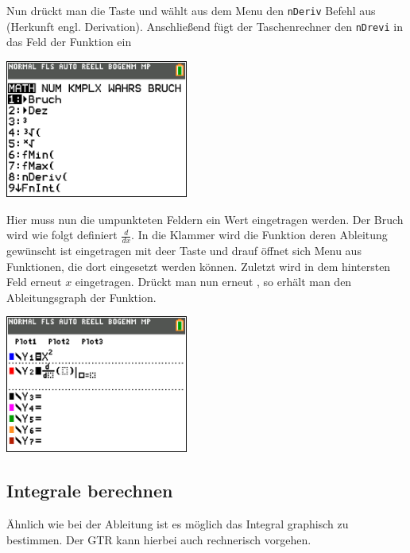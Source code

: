 \begin{paracol}{2}
\begin{flushleft}
	Nun drückt man die Taste  und wählt aus dem Menu den \texttt{nDeriv} Befehl aus (Herkunft engl. Derivation). Anschließend fügt der Taschenrechner den \texttt{nDrevi} in das Feld der Funktion ein
\end{flushleft}	
\switchcolumn
\begin{flushright}
\includegraphics[width=6cm]{Media/GRT/Visualisierung/ableitung_bestimmen/ableitung_bestimmen_2.png}
\end{flushright}
\end{paracol}

\begin{paracol}{2}
\begin{flushleft}
	Hier muss nun die umpunkteten Feldern ein Wert eingetragen werden. Der Bruch wird wie folgt definiert $\frac{d}{dx}$. In die Klammer wird die Funktion deren Ableitung gewünscht ist eingetragen mit deer Taste  und  drauf öffnet sich Menu aus Funktionen, die dort eingesetzt werden können. Zuletzt wird in dem hintersten Feld erneut $x$ eingetragen. Drückt man nun erneut , so erhält man den Ableitungsgraph der Funktion.
	\end{flushleft}	
\switchcolumn
\begin{flushright}
\includegraphics[width=6cm]{Media/GRT/Visualisierung/ableitung_bestimmen/ableitung_bestimmen_3.png}
\end{flushright}
\end{paracol}

\subsection{Integrale berechnen}
Ähnlich wie bei der Ableitung ist es möglich das Integral graphisch zu bestimmen. Der GTR kann hierbei auch rechnerisch vorgehen. 

